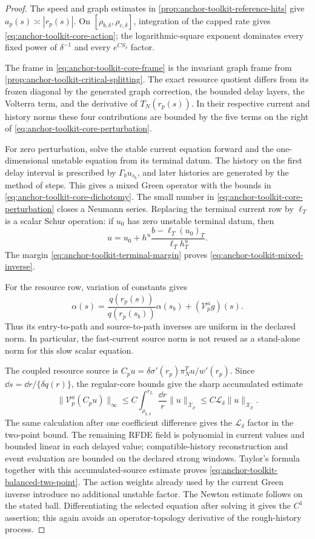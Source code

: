 \begin{proof}
The speed and graph estimates in
\cref{prop:anchor-toolkit-reference-hits} give
\(a_p(s)\asymp|r_p(s)|\).  On
\([\rho_{b,\delta},\rho_{c,\delta}]\), integration of the capped rate gives
\cref{eq:anchor-toolkit-core-action}; the logarithmic-square exponent
dominates every fixed power of \(\delta^{-1}\) and every
\(e^{CS_\delta}\) factor.

The frame in \cref{eq:anchor-toolkit-core-frame} is the invariant graph
frame from \cref{prop:anchor-toolkit-critical-splitting}.  The exact
resource quotient differs from its frozen diagonal by the generated graph
correction, the bounded delay layers, the Volterra term, and the derivative
of \(T_N(r_p(s))\).  In their respective current and history norms these
four contributions are bounded by the five terms on the right of
\cref{eq:anchor-toolkit-core-perturbation}.

For zero perturbation, solve the stable current equation forward and the
one-dimensional unstable equation from its terminal datum.  The history on
the first delay interval is prescribed by \(\Gamma_bu_{s_b}\), and later
histories are generated by the method of steps.  This gives a mixed Green
operator with the bounds in \cref{eq:anchor-toolkit-core-dichotomy}.  The
small number in \cref{eq:anchor-toolkit-core-perturbation} closes a Neumann
series.  Replacing the terminal current row by \(\ell_T\) is a scalar Schur
operation: if \(u_0\) has zero unstable terminal datum, then
\[
 u=u_0+h^u\frac{b-\ell_T(u_0)_T}{\ell_Th_T^u}.
\]
The margin \cref{eq:anchor-toolkit-terminal-margin} proves
\cref{eq:anchor-toolkit-mixed-inverse}.

For the resource row, variation of constants gives
\[
 \alpha(s)=\frac{q(r_p(s))}{q(r_p(s_b))}\alpha(s_b)
             +(\mathcal V_p^ag)(s).
\]
Thus its entry-to-path and source-to-path inverses are uniform in the
declared norm.  In particular, the fast-current source norm is not reused
as a stand-alone norm for this slow scalar equation.

The coupled resource source is
\(C_pu=\delta\sigma'(r_p)\pi_N^Tu/w'(r_p)\).  Since
\(\dd s=\dd r/\{\delta q(r)\}\), the regular-core bounds give the sharp
accumulated estimate
\[
 \|\mathcal V_p^a(C_pu)\|_\infty
 \le C\int_{\rho_{b,\delta}}^{r_L}\frac{\dd r}{r}
       \|u\|_{\mathcal X_p}
 \le C\mathscr L_\delta\|u\|_{\mathcal X_p}.
\]
The same calculation after one coefficient difference gives the
\(\mathscr L_\delta\) factor in the two-point bound.  The remaining RFDE
field is polynomial in current values and bounded linear in each delayed
value; compatible-history reconstruction and event evaluation are bounded
on the declared strong windows.  Taylor's formula together with this
accumulated-source estimate proves
\cref{eq:anchor-toolkit-balanced-two-point}.  The action weights already
used by the current Green inverse introduce no additional unstable factor.
The Newton estimate follows on the stated ball.  Differentiating the
selected equation after solving it gives the \(C^1\) assertion; this again
avoids an operator-topology derivative of the rough-history process.
\end{proof}
